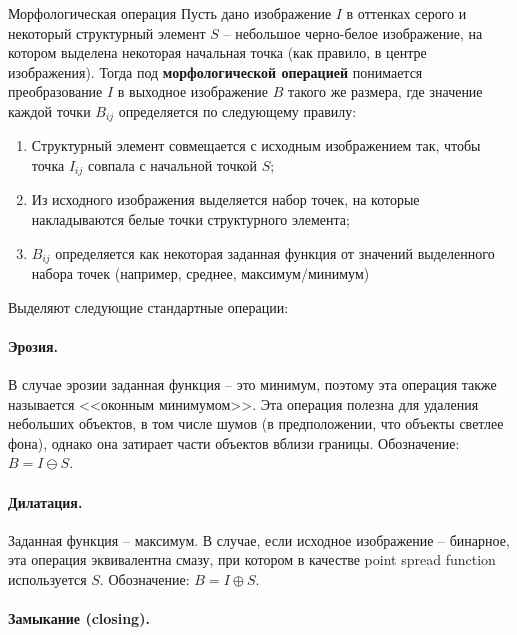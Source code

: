 
\begin{definition}{Морфологическая операция}
    Пусть дано изображение $I$ в оттенках серого и некоторый структурный элемент $S$ -- небольшое черно-белое изображение, на котором выделена некоторая начальная точка (как правило, в центре изображения). Тогда под \textbf{морфологической операцией} понимается преобразование $I$ в выходное изображение $B$ такого же размера, где значение каждой точки $B_{ij}$ определяется по следующему правилу:
    \begin{enumerate}
    \item
        Структурный элемент совмещается с исходным изображением так, чтобы точка $I_{ij}$ совпала с начальной точкой $S$;
    \item
        Из исходного изображения выделяется набор точек, на которые накладываются белые точки структурного элемента;
    \item
        $B_{ij}$ определяется как некоторая заданная функция от значений выделенного набора точек (например, среднее, максимум/минимум)
    \end{enumerate}
\end{definition}

Выделяют следующие стандартные операции:

\paragraph{Эрозия.}

В случае эрозии заданная функция -- это минимум, поэтому эта операция также называется <<оконным минимумом>>. Эта операция полезна для удаления небольших объектов, в том числе шумов (в предположении, что объекты светлее фона), однако она затирает части объектов вблизи границы. Обозначение: $B = I \ominus S$.

\paragraph{Дилатация.}

Заданная функция -- максимум. В случае, если исходное изображение -- бинарное, эта операция эквивалентна смазу, при котором в качестве point spread function используется $S$. Обозначение: $B = I \oplus S$.

\paragraph{Замыкание (closing).}

